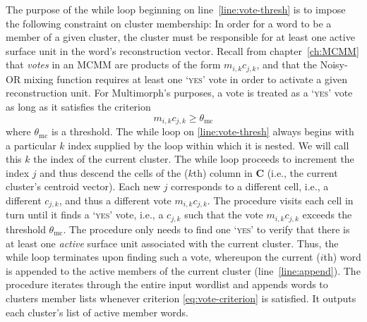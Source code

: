 The purpose of the while loop beginning on line~\ref{line:vote-thresh} is to impose the following constraint on cluster membership: In order for a word to be a member of a given cluster, the cluster must be responsible for at least one active surface unit in the word's reconstruction vector.
 Recall from chapter~\ref{ch:MCMM} that \emph{votes} in an MCMM are products of the form $m_{i,k}c_{j,k}$, and that the Noisy-OR mixing function requires at least one `\textsc{yes}' vote in order to activate a given reconstruction unit. For Multimorph's purposes, a vote is treated as a `\textsc{yes}' vote as long as it satisfies the criterion 
 \begin{equation}\label{eq:vote-criterion}
 m_{i,k}c_{j,k} \geq \theta_{\text{mc}}
 \end{equation}
 where $\theta_{\text{mc}}$ is a threshold. 
 The while loop on \ref{line:vote-thresh} always begins with a particular $k$ index supplied 
 by the loop within which it is nested. We will call this $k$ the index of the current cluster. 
 The while loop proceeds to increment the index $j$ and thus descend the cells of the ($k$th) 
 column in $\mathbf{C}$ (i.e., the current cluster's centroid vector). Each new $j$ corresponds 
 to a different cell, i.e., a different  $c_{j,k}$, and thus a different vote $m_{i,k}c_{j,k}$. 
 The procedure visits each cell in turn until it finds a `\textsc{yes}' vote, i.e., a $c_{j,k}$ 
 such that the vote $m_{i,k}c_{j,k}$ exceeds the threshold $\theta_{\text{mc}}$. The 
 procedure only needs to find one `\textsc{yes}' to verify that there is at least one \emph{active}
 surface unit associated with the current cluster. Thus, the while loop terminates upon finding 
 such a vote, whereupon
the current ($i$th) word is appended to the active members of the current cluster (line~\ref{line:append}). 
The procedure iterates through the entire input wordlist and appends words to clusters member lists 
whenever criterion \eqref{eq:vote-criterion} is satisfied. It outputs each cluster's list of active member words.
 
 

